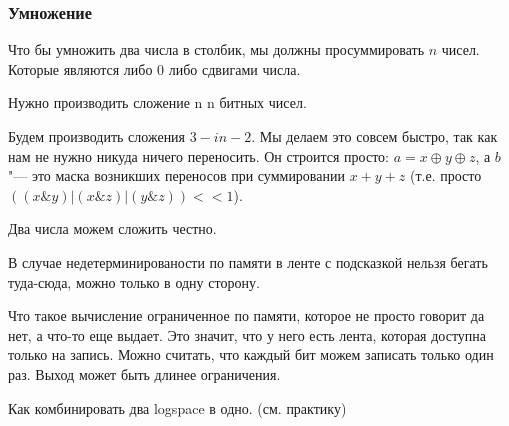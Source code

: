 \subsubsection{Умножение} 
Что бы умножить два числа в столбик, мы должны просуммировать $n$ чисел. 
Которые являются либо 0 либо сдвигами числа. 

Нужно производить сложение n n битных чисел. 

Будем производить сложения $3-in-2$.
Мы делаем это совсем быстро, так как нам не нужно никуда ничего переносить.
Он строится просто: $a = x \oplus y \oplus z$, а $b$ "--- это маска возникших переносов при суммировании $x+y+z$ (т.е. просто $((x \& y) | (x \& z) | (y \& z)) << 1$).

Два числа можем сложить честно.

\begin{Rem}
В случае недетерминированости по памяти
в ленте с подсказкой нельзя бегать туда-сюда, можно только в одну сторону.
\end{Rem}
\begin{Rem}
Что такое вычисление ограниченное по памяти, которое не просто 
говорит да нет, а что-то еще выдает. Это значит, что у него 
есть лента, которая доступна только на запись. Можно считать, 
что каждый бит можем записать только один раз. Выход может быть длинее
ограничения. 
\end{Rem}
Как комбинировать два logspace в одно. (см. практику) 

